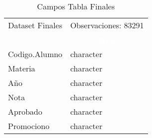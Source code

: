 \begin{table}[!h]

\caption{\label{tab:tabla_Dataset_Finales}Campos Tabla Finales}
\centering
\fontsize{10}{12}\selectfont
\begin{tabular}[t]{ll}
\toprule
\multicolumn{1}{c}{Dataset Finales} & \multicolumn{1}{c}{Observaciones: 83291} \\
\cmidrule(l{3pt}r{3pt}){1-1} \cmidrule(l{3pt}r{3pt}){2-2}
\rowcolor{black}  \multicolumn{1}{c}{\textcolor{white}{\textbf{variable}}} & \multicolumn{1}{c}{\textcolor{white}{\textbf{tipo}}}\\
\midrule
\rowcolor{gray!6}  Codigo.Alumno & character\\
Materia & character\\
\rowcolor{gray!6}  Año & character\\
Nota & character\\
\rowcolor{gray!6}  Aprobado & character\\
\addlinespace
Promociono & character\\
\bottomrule
\end{tabular}
\end{table}
